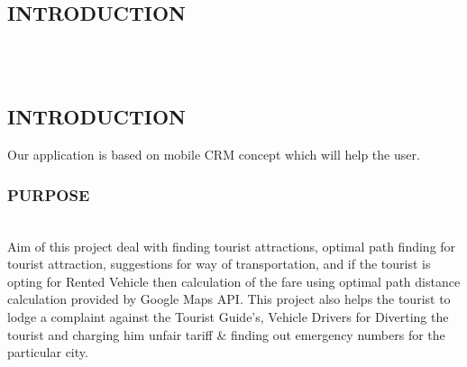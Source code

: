 \documentclass[12pt,a4paper]{article}
\begin{document}
\\

\newpage
{\setlength{\baselineskip}{1.5\baselineskip}
\tableofcontents
}

\newpage
{\setlength{\baselineskip}{1.5\baselineskip}
\listoftables
{}
}


\newpage
{\setlength{\baselineskip}{1.5\baselineskip}
\listoffigures
{}
}

\newpage
{\setlength{\baselineskip}{1.5\baselineskip}
\listoffigures
{}
}

\newpage
{}
\pagestyle{plain} 
\begin{center}
\section{INTRODUCTION}
\end{center}
\\
\\
\subsection{INTRODUCTION}
\hspace{0.7 cm}Our application is based on mobile CRM concept which will help the user.
\\
\subsubsection{PURPOSE}
\\
\hspace{0.7 cm}Aim of this project deal with finding tourist attractions, optimal path finding for tourist attraction, suggestions for way of transportation, and if the tourist is opting for Rented Vehicle then calculation of the fare using optimal path distance calculation provided by Google Maps API. This project also helps the tourist to lodge a complaint against the Tourist Guide’s, Vehicle Drivers for Diverting the tourist and charging him unfair tariff & finding out emergency numbers for the particular city.
\\
\end{document}
